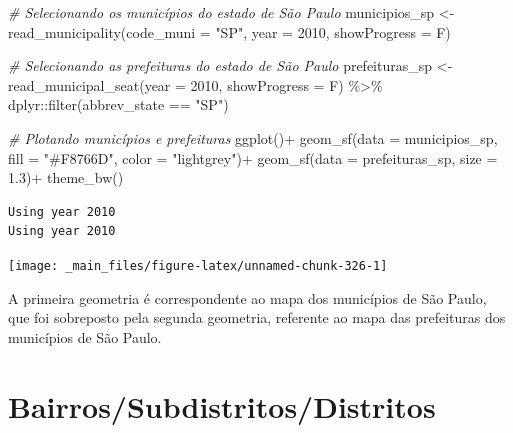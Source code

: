 \documentclass[
  brazilian,
]{book}
\newenvironment{Shaded}{\begin{snugshade}}{\end{snugshade}}
\newcommand{\AttributeTok}[1]{\textcolor[rgb]{0.77,0.63,0.00}{#1}}
\newcommand{\CommentTok}[1]{\textcolor[rgb]{0.56,0.35,0.01}{\textit{#1}}}
\newcommand{\DecValTok}[1]{\textcolor[rgb]{0.00,0.00,0.81}{#1}}
\newcommand{\FloatTok}[1]{\textcolor[rgb]{0.00,0.00,0.81}{#1}}
\newcommand{\FunctionTok}[1]{\textcolor[rgb]{0.00,0.00,0.00}{#1}}
\newcommand{\NormalTok}[1]{#1}
\newcommand{\OtherTok}[1]{\textcolor[rgb]{0.56,0.35,0.01}{#1}}
\newcommand{\SpecialCharTok}[1]{\textcolor[rgb]{0.00,0.00,0.00}{#1}}
\newcommand{\StringTok}[1]{\textcolor[rgb]{0.31,0.60,0.02}{#1}}
\begin{document}
\begin{Shaded}
\begin{Highlighting}[]
\CommentTok{\# Selecionando os municípios do estado de São Paulo}
\NormalTok{municipios\_sp }\OtherTok{\textless{}{-}} \FunctionTok{read\_municipality}\NormalTok{(}\AttributeTok{code\_muni =} \StringTok{"SP"}\NormalTok{,}
                                   \AttributeTok{year =} \DecValTok{2010}\NormalTok{,}
                                   \AttributeTok{showProgress =}\NormalTok{ F)}


\CommentTok{\# Selecionando as prefeituras do estado de São Paulo}
\NormalTok{prefeituras\_sp }\OtherTok{\textless{}{-}} \FunctionTok{read\_municipal\_seat}\NormalTok{(}\AttributeTok{year =} \DecValTok{2010}\NormalTok{,}
                                      \AttributeTok{showProgress =}\NormalTok{ F) }\SpecialCharTok{\%\textgreater{}\%} 
\NormalTok{  dplyr}\SpecialCharTok{::}\FunctionTok{filter}\NormalTok{(abbrev\_state }\SpecialCharTok{==} \StringTok{"SP"}\NormalTok{)}


\CommentTok{\# Plotando municípios e prefeituras}
\FunctionTok{ggplot}\NormalTok{()}\SpecialCharTok{+}
  \FunctionTok{geom\_sf}\NormalTok{(}\AttributeTok{data =}\NormalTok{ municipios\_sp, }\AttributeTok{fill =} \StringTok{"\#F8766D"}\NormalTok{, }\AttributeTok{color =} \StringTok{"lightgrey"}\NormalTok{)}\SpecialCharTok{+}
  \FunctionTok{geom\_sf}\NormalTok{(}\AttributeTok{data =}\NormalTok{ prefeituras\_sp, }\AttributeTok{size =} \FloatTok{1.3}\NormalTok{)}\SpecialCharTok{+}
  \FunctionTok{theme\_bw}\NormalTok{()}
\end{Highlighting}
\end{Shaded}

\begin{verbatim}
Using year 2010
Using year 2010
\end{verbatim}

\begin{center}\texttt{[image: \_main\_files/figure-latex/unnamed-chunk-326-1]} \end{center}

A primeira geometria é correspondente ao mapa dos municípios de São Paulo, que foi sobreposto pela segunda geometria, referente ao mapa das prefeituras dos municípios de São Paulo.

\hypertarget{bairrossubdistritosdistritos}{%
\section{Bairros/Subdistritos/Distritos}\label{bairrossubdistritosdistritos}}
\end{document}

